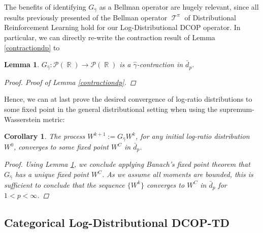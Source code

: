 \documentclass[12pt,a4paper,openright,twoside]{article}
\DeclareMathOperator*{\R}{\mathbb{R}}
\DeclareMathOperator*{\T}{\mathcal{T}}
\numberwithin{equation}{section}
\newtheorem{corol}[theorem]{Corollary}
\newtheorem{lemma}[theorem]{Lemma}
\theoremstyle{definition}
\theoremstyle{remark}
\theoremstyle{plain}
\begin{document}
The benefits of identifying $G_{\hat{\gamma}}$ as a Bellman operator are hugely relevant, since all results previously presented of the Bellman operator $\T^\pi$ of Distributional Reinforcement Learning hold for our Log-Distributional DCOP operator.  In particular, we can directly re-write the contraction result of Lemma \ref{contractiondp} to

\begin{lemma} \label{contractiondpG}
	$G_{\hat{\gamma}} : \mathcal{P}(\R) \rightarrow \mathcal{P}(\R)$ is a $\hat{\gamma}$-contraction in $\bar{d}_p$.
	\begin{proof}
		Proof of Lemma \ref{contractiondp}.
	\end{proof}
\end{lemma}

Hence, we can at last prove the desired convergence of log-ratio distributions to some fixed point in the general distributional setting when using the supremum-Wasserstein metric:

\begin{corol}
	The process $W^{k+1} := G_{\hat{\gamma}} W^k$, for any initial log-ratio distribution $W^0$, converges to some fixed point $W^C$ in $\bar{d}_p$.
	\begin{proof}
		Using Lemma \ref{contractiondpG}, we conclude applying Banach's fixed point theorem that $G_{\hat{\gamma}}$ has a unique fixed point $W^C$. As we assume all moments are bounded, this is sufficient to conclude that the sequence $\{W^k\}$ converges to $W^C$ in $\bar{d}_p$ for $1 < p < \infty$.
	\end{proof} 
\end{corol}




\subsection{Categorical Log-Distributional DCOP-TD}
\end{document}
